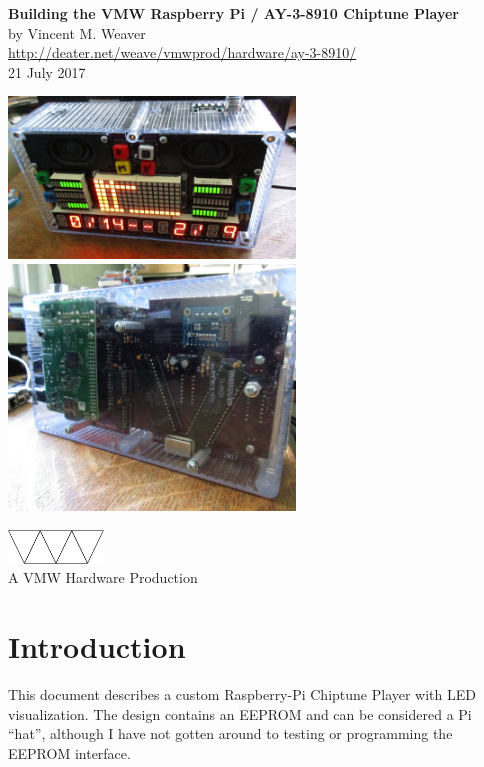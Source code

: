 \documentclass[11pt]{article}
\begin{document}
\begin{center}
{\Large \bf Building the VMW Raspberry Pi / AY-3-8910 Chiptune Player}\\[2ex]
by Vincent M. Weaver\\[3ex]
\url{http://deater.net/weave/vmwprod/hardware/ay-3-8910/}\\[3ex]
21 July 2017
\end{center}

\begin{center}
\includegraphics[width=3in]{figs/0377_front_view.jpg}
\includegraphics[width=3in]{figs/0378_back_view.jpg}
\end{center}
\vspace{3ex}
\begin{center}
\includegraphics[width=1in]{figs/vmw}\\
A VMW Hardware Production
\end{center}

\pagebreak

\section{Introduction}

This document describes a custom Raspberry-Pi Chiptune Player with
LED visualization.
The design contains an EEPROM and can be considered a Pi ``hat'', although
I have not gotten around to testing or programming the EEPROM interface.
\end{document}
